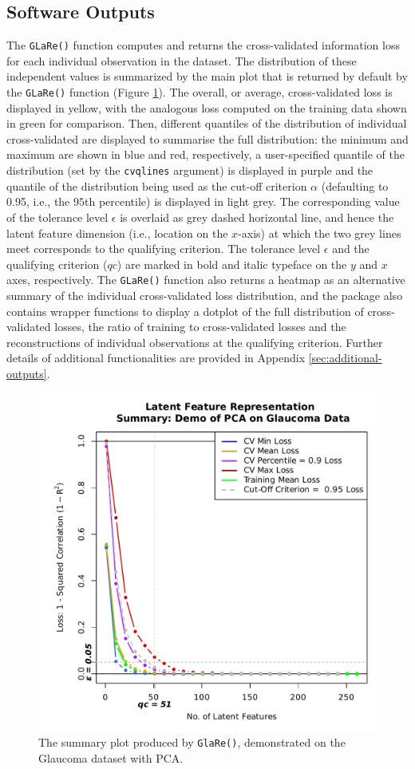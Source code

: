 \subsection{Software Outputs}

The \texttt{GLaRe()} function computes and returns the cross-validated information loss for each individual observation in the dataset.
The distribution of these independent values is summarized by the main plot that is returned by default by the \texttt{GLaRe()} function (Figure \ref{fig:glare-anatomy-plot}).
The overall, or average, cross-validated loss is displayed in yellow, with the analogous loss computed on the training data shown in green for comparison.
Then, different quantiles of the distribution of individual cross-validated are displayed to summarise the full distribution: the minimum and maximum are shown in blue and red, respectively, a user-specified quantile of the distribution (set by the \texttt{cvqlines} argument) is displayed in purple and the quantile of the distribution being used as the cut-off criterion $\alpha$ (defaulting to 0.95, i.e., the $95$th percentile) is displayed in light grey.
The corresponding value of the tolerance level $\epsilon$ is overlaid as grey dashed horizontal line, and hence the latent feature dimension (i.e., location on the $x$-axis) at which the two grey lines meet corresponds to the qualifying criterion.
The tolerance level $\epsilon$ and the qualifying criterion ($qc$) are marked in bold and italic typeface on the $y$ and $x$ axes, respectively.
The \texttt{GLaRe()} function also returns a heatmap as an alternative summary of the individual cross-validated loss distribution, and the package also contains wrapper functions to display a dotplot of the full distribution of cross-validated losses, the ratio of training to cross-validated losses and the reconstructions of individual observations at the qualifying criterion. 
Further details of additional functionalities are provided in Appendix \ref{sec:additional-outputs}.

\begin{figure}
    \centering
    \includegraphics[width=0.5\linewidth]{figures/glare-anatomy-plot.pdf}
    \caption{The summary plot produced by \texttt{GlaRe()}, demonstrated on the Glaucoma dataset with PCA.}
    \label{fig:glare-anatomy-plot}
\end{figure}
